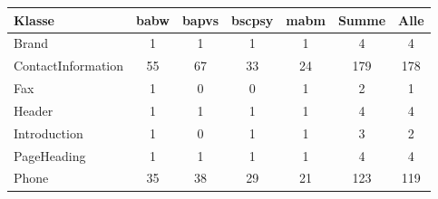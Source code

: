     \begin{table}[htb]
        \centering
        \begin{tabular}{|l|c|c|c|c|c|c|}
        \hline
            \textbf{Klasse}  & \multicolumn{1}{l|}{\textbf{\gls{babw}}} & \multicolumn{1}{l|}{\textbf{\gls{bapvs}}} & \multicolumn{1}{l|}{\textbf{\gls{bscpsy}}} & \multicolumn{1}{l|}{\textbf{\gls{mabm}}} & \multicolumn{1}{l|}{\textbf{Summe}} & \multicolumn{1}{l|}{\textbf{Alle}} \\ \hline
            Brand              & 1                                  & 1                                   & 1                                    & 1                                  & 4                                   & 4                                  \\ \hline
            ContactInformation & 55                                 & 67                                  & 33                                   & 24                                 & 179                                 & 178                                \\ \hline
            Fax                & 1                                  & 0                                   & 0                                    & 1                                  & 2                                   & 1                                  \\ \hline
            Header             & 1                                  & 1                                   & 1                                    & 1                                  & 4                                   & 4                                  \\ \hline
            Introduction       & 1                                  & 0                                   & 1                                    & 1                                  & 3                                   & 2                                  \\ \hline
            PageHeading        & 1                                  & 1                                   & 1                                    & 1                                  & 4                                   & 4                                  \\ \hline
            Phone              & 35                                 & 38                                  & 29                                   & 21                                 & 123                                 & 119                                \\ \hline

\end{tabular}
\end{table}
